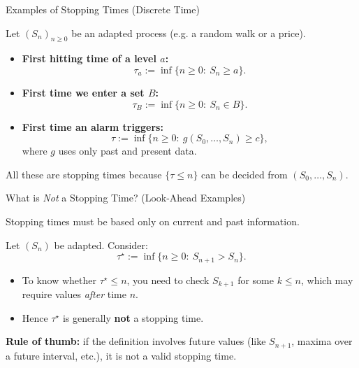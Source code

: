 \documentclass[10pt,aspectratio=169]{beamer}
\begin{document}
\begin{frame}{Examples of Stopping Times (Discrete Time)}

Let \((S_n)_{n\ge 0}\) be an adapted process (e.g. a random walk or a price).\pause

\begin{itemize}
  \item \textbf{First hitting time of a level \(a\):}\pause
  \[
  \tau_a := \inf\{n\ge 0:\ S_n \ge a\}.
  \]
  \item \textbf{First time we enter a set \(B\):}\pause
  \[
  \tau_B := \inf\{n\ge 0:\ S_n \in B\}.
  \]
  \item \textbf{First time an alarm triggers:}\pause
  \[
  \tau := \inf\{n\ge 0:\ g(S_0,\dots,S_n)\ge c\},
  \]
  where \(g\) uses only past and present data.\pause
\end{itemize}

\medskip
All these are stopping times because \(\{\tau\le n\}\) can be decided from \((S_0,\dots,S_n)\).\pause

\end{frame}

\begin{frame}{What is \emph{Not} a Stopping Time? (Look-Ahead Examples)}

Stopping times must be based only on current and past information.\pause

\medskip
Let \((S_n)\) be adapted. Consider:\pause
\[
\tau^\star := \inf\{n\ge 0:\ S_{n+1} > S_n\}.
\]
\pause
\begin{itemize}
  \item To know whether \(\tau^\star \le n\), you need to check \(S_{k+1}\) for some \(k\le n\), which may require values \emph{after} time \(n\).\pause
  \item Hence \(\tau^\star\) is generally \textbf{not} a stopping time.\pause
\end{itemize}

\medskip
\textbf{Rule of thumb:}\pause\;
if the definition involves future values (like \(S_{n+1}\), maxima over a future interval, etc.),
it is not a valid stopping time.

\end{frame}
\end{document}
